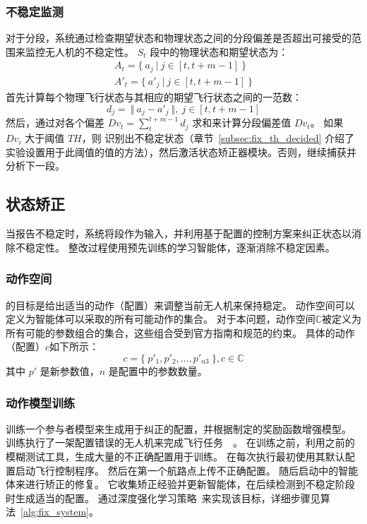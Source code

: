 \subsubsection{不稳定监测}
对于分段，系统通过检查期望状态和物理状态之间的分段偏差是否超出可接受的范围来监控无人机的不稳定性。
$S_t$ 段中的物理状态和期望状态为：
\begin{equation}
\begin{aligned}
    A_t = \{~a_j~|~j \in [t, t+m-1]~\}\\
    A'_t = \{~a'_j~|~j \in [t, t+m-1]~\}
\end{aligned}
\end{equation}
\nyctea 首先计算每个物理飞行状态与其相应的期望飞行状态之间的一范数：
\begin{equation}
d_j = ~\Vert~a_j - a'_j~\Vert, ~j \in [t, t+m-1]
\end{equation}
然后，\nyctea 通过对各个偏差 $Dv_t=\sum_{t}^{t+m-1}{d_j}$ 求和来计算分段偏差值 $Dv_t$。
如果 $Dv_i$ 大于阈值 $TH$，则 \nyctea 识别出不稳定状态（章节~\ref{subsec:fix_th_decided} 介绍了实验设置用于此阈值的值的方法），然后激活状态矫正器模块。否则，\nyctea 继续捕获并分析下一段。

\subsection{状态矫正}
当报告不稳定时，系统将段作为输入，并利用基于配置的控制方案来纠正状态以消除不稳定性。
整改过程使用预先训练的学习智能体，逐渐消除不稳定因素。

\subsubsection{动作空间}  
\nyctea 的目标是给出适当的动作（配置）来调整当前无人机来保持稳定。
动作空间可以定义为智能体可以采取的所有可能动作的集合。
对于本问题，动作空间$\mathbb{C}$被定义为所有可能的参数组合的集合，这些组合受到官方指南和规范的约束。
具体的动作（配置）$c$如下所示：
\begin{equation}
    c = \{~p'_1, p'_2, ..., p'_{n3}~\}, c \in \mathbb{C}
\end{equation}
其中 $p'$ 是新参数值，$n$ 是配置中的参数数量。

\subsubsection{动作模型训练}
\nyctea 训练一个参与者模型来生成用于纠正的配置，并根据制定的奖励函数增强模型。
训练执行了一架配置错误的无人机来完成飞行任务~~\cite{avc}。
在训练之前，\nyctea 利用之前的模糊测试工具，生成大量的不正确配置用于训练。
在每次执行最初使用其默认配置启动飞行控制程序。
然后在第一个航路点上传不正确配置。
随后启动\nyctea 中的智能体来进行矫正的修复。
它收集矫正经验并更新智能体，在后续检测到不稳定阶段时生成适当的配置。
\nyctea 通过深度强化学习策略~\cite{lillicrap2015continuous}来实现该目标，详细步骤见算法~\ref{alg:fix_system}。

